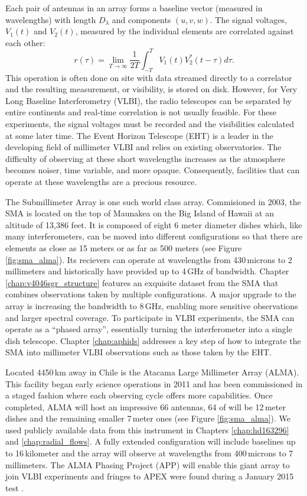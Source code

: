 Each pair of antennas in an array forms a baseline vector (measured in wavelengths) with length $D_\lambda$ and 
components $(u,v,w)$.  The signal voltages, $V_1(t)$ and $V_2(t)$, measured by the individual 
elements are correlated against each other:
\begin{equation}
r(\tau) = \lim_{T \to \infty} \frac{1}{2T} \int_{-T}^T V_1(t) V_2^\ast(t-\tau) d\tau.
\end{equation}
This operation is often done on site with data streamed directly to a correlator and the resulting 
measurement, or visibility, is stored on disk.  However, for Very Long Baseline Interferometry (VLBI), the 
radio telescopes can be separated by entire continents and real-time correlation is not usually feasible.  For 
these experiments, the signal voltages must be recorded and the visibilities calculated at some later time.  The 
Event Horizon Telescope (EHT) is a leader in the developing field of millimeter VLBI and relies on existing 
observatories.  The difficulty of observing at these short wavelengths increases as the atmosphere becomes 
noiser, time variable, and more opaque.  Consequently, facilities that can operate at these wavelengths are a 
precious resource.

The Submillimeter Array \citep[SMA;][]{ho04} is one such world class array.  Commisioned in 2003, the SMA is 
located on the top of Maunakea on the Big Island of Hawaii at an altitude of 13,386 feet.
It is composed of eight 6 meter diameter dishes which, like many interferometers, can be moved into different 
configurations so that there are elements as close as 15 meters or as far as 500 meters (see Figure 
\ref{fig:sma_alma}).  Its recievers can operate at wavelengths from 430\,microns to 2\,millimeters and 
historically have provided up to 4\,GHz of bandwidth.  Chapter \ref{chap:v4046sgr_structure} features an 
exquisite dataset from the SMA that combines observations taken by multiple configurations.  A major upgrade to 
the array is increasing the bandwidth to 8\,GHz, enabling more sensitive observations and larger spectral 
coverage.  To participate in VLBI experiments, the SMA can operate as a ``phased array'', essentially turning 
the interferometer into a single dish telescope.  Chapter \ref{chap:aphids} addresses a key step of how to 
integrate the SMA into millimeter VLBI observations such as those taken by the EHT.

Located 4450\,km away in Chile is the Atacama Large Millimeter Array (ALMA).  This facility began early
science operations in 2011 and has been commissioned in a staged fashion where each observing cycle offers more 
capabilities.  Once completed, ALMA will host an impressive 66 antennas, 64 of will be 12\,meter dishes and
the remaining smaller 7\,meter ones (see Figure \ref{fig:sma_alma}).  We used publicly available data from 
this instrument in Chapters \ref{chap:hd163296} and \ref{chap:radial_flows}.  A fully extended configuration 
will include baselines up to 16\,kilometer and the array will observe at wavelengths from 400\,microns to 
7\,millimeters.  The ALMA Phasing Project (APP) will enable this giant array to join VLBI experiments and 
fringes to APEX were found during a January 2015 test \citep{matthews15}.

